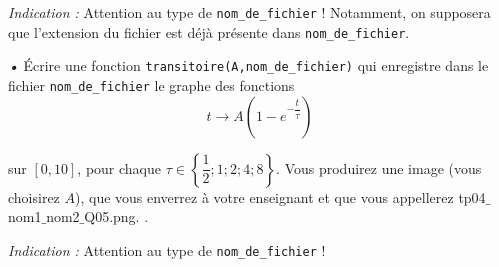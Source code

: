 \emph{Indication :} Attention au type de \texttt{nom\_de\_fichier} ! Notamment, on supposera que l'extension du fichier est déjà présente dans \texttt{nom\_de\_fichier}.

\medskip{}
\emph{•}
\question %
 \'Ecrire une fonction \texttt{transitoire(A,nom\_de\_fichier)} qui enregistre dans le fichier \texttt{nom\_de\_fichier} le graphe des fonctions 
\begin{equation*}
  t \to A\left(1-e^{-\dfrac{t}{\tau}}\right)
\end{equation*}


sur $[0,10]$, pour chaque $\tau\in\left\{\dfrac{1}{2};1;2;4;8\right\}$. 
Vous produirez une image (vous choisirez $A$), que vous enverrez à votre enseignant et que vous appellerez tp04$\_$nom1$\_$nom2$\_$Q05.png. . 

\emph{Indication :} Attention au type de \texttt{nom\_de\_fichier} !